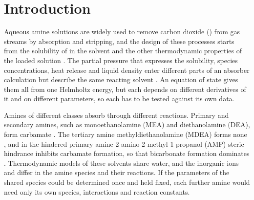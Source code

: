 \section{Introduction}\label{sec:introduction}
Aqueous amine solutions are widely used to remove carbon dioxide (\COtwo) from gas streams by absorption and stripping, and the design of these processes starts from the solubility of \COtwo in the solvent and the other thermodynamic properties of the loaded solution \cite{Zhang2011}.
The \COtwo partial pressure that expresses the solubility, species concentrations, heat release and liquid density enter different parts of an absorber calculation but describe the same reacting solvent \cite{Zhang2011,Freguia2003,Amundsen2009}.
An equation of state gives them all from one Helmholtz energy, but each depends on different derivatives of it and on different parameters, so each has to be tested against its own data.

Amines of different classes absorb \COtwo through different reactions.
Primary and secondary amines, such as monoethanolamine (MEA) and diethanolamine (DEA), form carbamate \cite{xuRepresentationEquilibriumSolubility1992}.
The tertiary amine methyldiethanolamine (MDEA) forms none \cite{Nasrifar2010}, and in the hindered primary amine 2-amino-2-methyl-1-propanol (AMP) steric hindrance inhibits carbamate formation, so that bicarbonate formation dominates \cite{xuRepresentationEquilibriumSolubility1992}.
Thermodynamic models of these solvents share water, \COtwo and the inorganic ions and differ in the amine species and their reactions.
If the parameters of the shared species could be determined once and held fixed, each further amine would need only its own species, interactions and reaction constants.

